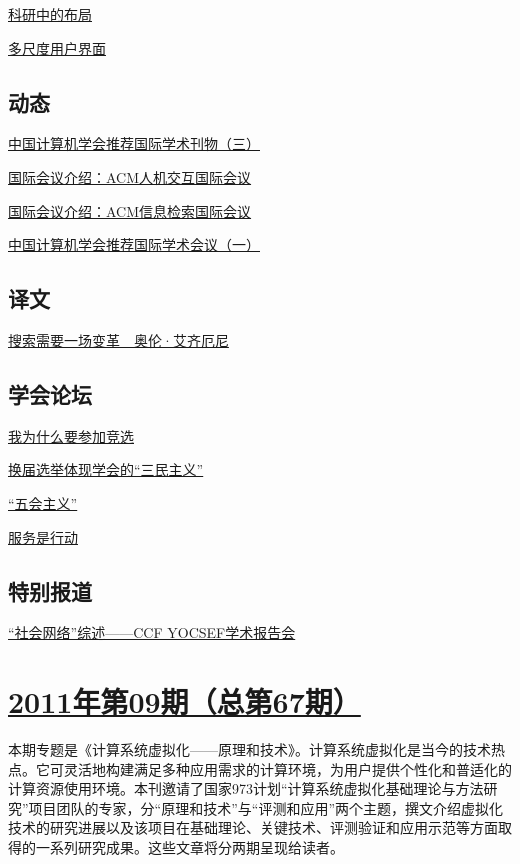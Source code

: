 \documentclass[a4paper]{article}
\begin{document}
\href{http://history.ccf.org.cn/resources/1190201776262/2011/10/17/7.pdf}{科研中的布局}

\href{http://history.ccf.org.cn/resources/1190201776262/2011/10/17/8.pdf}{多尺度用户界面}

\subsection{动态}
\href{http://history.ccf.org.cn/resources/1190201776262/2011/10/17/12.pdf}{中国计算机学会推荐国际学术刊物（三）}

\href{http://history.ccf.org.cn/resources/1190201776262/2011/10/17/10.pdf}{国际会议介绍：ACM人机交互国际会议}

\href{http://history.ccf.org.cn/resources/1190201776262/2011/10/17/11.pdf}{国际会议介绍：ACM信息检索国际会议}

\href{http://history.ccf.org.cn/resources/1190201776262/2011/10/17/13.pdf}{中国计算机学会推荐国际学术会议（一）}

\subsection{译文}
\href{http://history.ccf.org.cn/resources/1190201776262/2011/10/17/14.pdf}{搜索需要一场变革　奥伦·艾齐厄尼}

\subsection{学会论坛}
\href{http://history.ccf.org.cn/resources/1190201776262/2011/10/17/17.pdf}{我为什么要参加竞选}

\href{http://history.ccf.org.cn/resources/1190201776262/2011/10/17/16.pdf}{换届选举体现学会的“三民主义”}

\href{http://history.ccf.org.cn/resources/1190201776262/2011/10/17/18.pdf}{“五会主义”}

\href{http://history.ccf.org.cn/resources/1190201776262/2011/10/17/19.pdf}{服务是行动}

\subsection{特别报道}
\href{http://history.ccf.org.cn/resources/1190201776262/2011/10/17/15.pdf}{“社会网络”综述——CCF YOCSEF学术报告会}


\section{\href{http://history.ccf.org.cn/sites/ccf/jsjtbbd.jsp?contentId=2632927725900}{\textbf{2011年第09期（总第67期）}}}
本期专题是《计算系统虚拟化——原理和技术》。计算系统虚拟化是当今的技术热点。它可灵活地构建满足多种应用需求的计算环境，为用户提供个性化和普适化的计算资源使用环境。本刊邀请了国家973计划“计算系统虚拟化基础理论与方法研究”项目团队的专家，分“原理和技术”与“评测和应用”两个主题，撰文介绍虚拟化技术的研究进展以及该项目在基础理论、关键技术、评测验证和应用示范等方面取得的一系列研究成果。这些文章将分两期呈现给读者。
\end{document}
